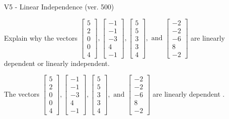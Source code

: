 \begin{exercise}
  \begin{exerciseTitle}V5 - Linear Independence (ver. 500)\end{exerciseTitle}
  \begin{exerciseStatement}
    Explain why the vectors \(\left[\begin{array}{r}
5 \\
2 \\
0 \\
0 \\
4
\end{array}\right] , \left[\begin{array}{r}
-1 \\
-1 \\
-3 \\
4 \\
-1
\end{array}\right] , \left[\begin{array}{r}
5 \\
5 \\
3 \\
3 \\
4
\end{array}\right] , \text{ and } \left[\begin{array}{r}
-2 \\
-2 \\
-6 \\
8 \\
-2
\end{array}\right]\) are linearly dependent or linearly independent.	


  \end{exerciseStatement}
  \begin{exerciseAnswer}
   The vectors \(\left[\begin{array}{r}
5 \\
2 \\
0 \\
0 \\
4
\end{array}\right] , \left[\begin{array}{r}
-1 \\
-1 \\
-3 \\
4 \\
-1
\end{array}\right] , \left[\begin{array}{r}
5 \\
5 \\
3 \\
3 \\
4
\end{array}\right] , \text{ and } \left[\begin{array}{r}
-2 \\
-2 \\
-6 \\
8 \\
-2
\end{array}\right]\) are 
  	 linearly dependent  .
  


  \end{exerciseAnswer}
\end{exercise}